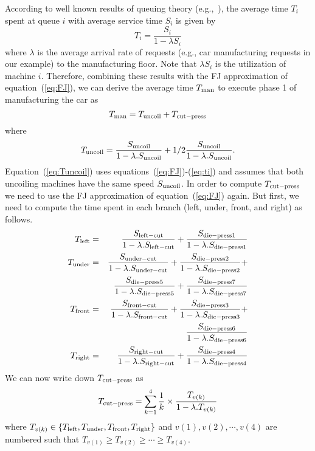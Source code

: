 \documentclass[a4paper, 12pt]{article} %
\begin{document}
According to well known results of queuing theory (e.g.,~\cite{MAD2004}), the average time $T_i$ spent at  queue $i$ with average service time $S_i$ is given by
\begin{equation}
T_i = \frac{S_i}{1 - \lambda S_i} \label{eq:ti}
\end{equation}
 where $\lambda$ is the average arrival rate of requests (e.g., car manufacturing requests in our example) to the manufacturing floor. Note that $\lambda  S_i$ is the utilization of machine $i$. Therefore, combining these results with the FJ approximation of equation~(\ref{eq:FJ}), we can derive the average time $T_{\rm man}$ to execute phase 1 of manufacturing the car as 
 \begin{equation}
T_{\rm man} = T_{\rm uncoil} + T_{\rm cut-press}
\end{equation}
where
\begin{equation}
T_{\rm uncoil} = \frac{S_{\rm uncoil}}{1 - \lambda . S_{\rm uncoil}} + 1/2 \frac{S_{\rm uncoil}}{1 - \lambda . S_{\rm uncoil}}. \label{eq:Tuncoil}
\end{equation}
Equation~(\ref{eq:Tuncoil}) uses equations~(\ref{eq:FJ})-(\ref{eq:ti}) and assumes that both uncoiling machines have the same speed $S_{\rm uncoil}$. In order to compute $T_{\rm cut-press}$ we need to use the FJ approximation of 
equation~(\ref{eq:FJ}) again. But first, we need to compute  the time spent in each branch (left, under, front, and right)  as follows. 
\begin{eqnarray}
T_{\rm left} &=& \frac{S_{\rm left-cut}}{1 - \lambda . S_{\rm left-cut}} + \frac{S_{\rm die-press1}}{1 - \lambda . S_{\rm die-press1}} \nonumber \\
T_{\rm under} &=&  \frac{S_{\rm under-cut}}{1 - \lambda . S_{\rm under-cut}} +
                                 \frac{S_{\rm die-press2}}{1 - \lambda . S_{\rm die-press2}} + \nonumber \\
                       &&    \frac{S_{\rm die-press5}}{1 - \lambda . S_{\rm die-press5}} +
                                 \frac{S_{\rm die-press7}}{1 - \lambda . S_{\rm die-press7}} \nonumber \\
T_{\rm front} &=&  \frac{S_{\rm front-cut}}{1 - \lambda . S_{\rm front-cut}} +
                                 \frac{S_{\rm die-press3}}{1 - \lambda . S_{\rm die-press3}} + \nonumber \\
                       &&    \frac{S_{\rm die-press6}}{1 - \lambda . S_{\rm die-press6}}  \nonumber \\
T_{\rm right} &=& \frac{S_{\rm right-cut}}{1 - \lambda . S_{\rm right-cut}} + \frac{S_{\rm die-press4}}{1 - \lambda . S_{\rm die-press4}}   \label{eq:branches}                 
\end{eqnarray}
We can now write down $T_{\rm cut-press}$ as
\begin{equation}
T_{\rm cut-press} = \sum_{k=1}^4 \frac{1}{k} \times  \frac{T_{v (k)}}{1 - \lambda . T_{v (k)}}
     \label{eq:tcut-press}
\end{equation}
where $T_{v (k)} \in \{T_{\rm left}, T_{\rm under}, T_{\rm front}, T_{\rm right}\}$ and $v (1), v(2), \cdots, v (4)$ are numbered such that $T_{v (1)} \geq T_{v (2)} \geq \cdots \geq T_{v (4)}$.
\end{document}
